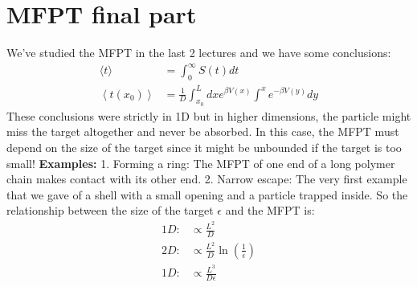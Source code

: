\documentclass{report}
\begin{document}
\section{MFPT final part}
We've studied the MFPT in the last 2 lectures and we have some conclusions:
\begin{align}
    \langle t\rangle                            & =\int_0^{\infty} S(t) d t                                               \\
    \left\langle t\left(x_0\right)\right\rangle & =\frac{1}{D} \int^L_{x_0} d x e^{\beta V(x)} \int^x e^{-\beta V(y)} d y
\end{align}
These conclusions were strictly in 1D but in higher dimensions, the particle might miss the target altogether and never be absorbed. In this case, the MFPT must depend on the size of the target since it might be unbounded if the target is too small!
\textbf{Examples:} 1. Forming a ring: The MFPT of one end of a long polymer chain makes contact with its other end. 2. Narrow escape: The very first example that we gave of a shell with a small opening and a particle trapped inside.
So the relationship between the size of the target $\epsilon$ and the MFPT is:
\begin{align}
    1D: & \propto \frac{L^2}{D}                         \\
    2D: & \propto \frac{L^2}{D} \ln(\frac{1}{\epsilon}) \\
    1D: & \propto \frac{L^3}{D\epsilon}
\end{align}
\end{document}
